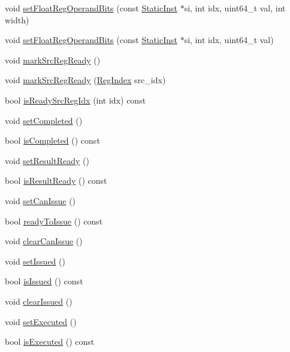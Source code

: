\begin{DoxyCompactItemize}
\item 
void \hyperlink{classBaseDynInst_ad3fddac379ba976d902adbf2786afbda}{setFloatRegOperandBits} (const \hyperlink{classStaticInst}{StaticInst} $\ast$si, int idx, uint64\_\-t val, int width)
\item 
void \hyperlink{classBaseDynInst_acede5db0b5bbd5e03f6fb096c7ccf1b6}{setFloatRegOperandBits} (const \hyperlink{classStaticInst}{StaticInst} $\ast$si, int idx, uint64\_\-t val)
\item 
void \hyperlink{classBaseDynInst_acd6444fdff2557922a35895eccab2d0f}{markSrcRegReady} ()
\item 
void \hyperlink{classBaseDynInst_a20a741d6245dcbf24bb3bc167946e1ec}{markSrcRegReady} (\hyperlink{classBaseDynInst_a36d25e03e43fa3bb4c5482cbefe5e0fb}{RegIndex} src\_\-idx)
\item 
bool \hyperlink{classBaseDynInst_ad09a59cb16b4b96a42398b3bcd23cd2b}{isReadySrcRegIdx} (int idx) const 
\item 
void \hyperlink{classBaseDynInst_a3241c8bad3d5ddb517721b999a4e3670}{setCompleted} ()
\item 
bool \hyperlink{classBaseDynInst_a9065f06f69273b51a799acff12d2c4c7}{isCompleted} () const 
\item 
void \hyperlink{classBaseDynInst_a142437d4d0962c5b61960661f5141891}{setResultReady} ()
\item 
bool \hyperlink{classBaseDynInst_aa494f3355348eb3a97ce809b6361e195}{isResultReady} () const 
\item 
void \hyperlink{classBaseDynInst_a2531049d5481976af68c8586015f0047}{setCanIssue} ()
\item 
bool \hyperlink{classBaseDynInst_a29fcc55658982386428d8035e438589f}{readyToIssue} () const 
\item 
void \hyperlink{classBaseDynInst_aad2d885accd9c810610076b4837a1d49}{clearCanIssue} ()
\item 
void \hyperlink{classBaseDynInst_a04eb3fc23b5c2e74dc6d12afc25f0198}{setIssued} ()
\item 
bool \hyperlink{classBaseDynInst_a1b4092ba688a1efd54c934a31dd1fd3e}{isIssued} () const 
\item 
void \hyperlink{classBaseDynInst_ae6e7d08fe9e92022d54514af18b5b36a}{clearIssued} ()
\item 
void \hyperlink{classBaseDynInst_a22145fd061c0a41a9b7d3c8b499269a9}{setExecuted} ()
\item 
bool \hyperlink{classBaseDynInst_a25d5f6d24c54820fbd19eb0e4e59dcac}{isExecuted} () const 
\item 

\end{DoxyCompactItemize}
